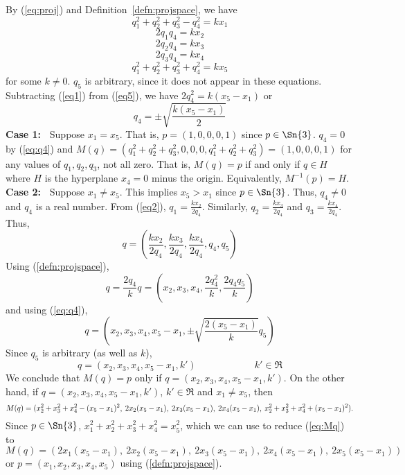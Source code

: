 By (\ref{eq:proj}) and Definition~\ref{defn:projspace}, we have
\begin{equation}
\label{eq1}
	q_1^2 + q_2^2 + q_3^2 - q_4^2 = kx_1
\end{equation}
\begin{equation}
\label{eq2}
	2q_1q_4	= kx_2
\end{equation}
\begin{equation}
\label{eq3}
	2q_2q_4	= kx_3
\end{equation}
\begin{equation}
\label{eq4}
	2q_3q_4	= kx_4
\end{equation}
\begin{equation}
\label{eq5}
	q_1^2 + q_2^2 + q_3^2 + q_4^2 = kx_5
\end{equation}
for some $k \neq 0$.
$q_5$ is arbitrary, since it does not appear in these equations.
Subtracting (\ref{eq1}) from (\ref{eq5}), 
we have $2q_4^2 = k(x_5 - x_1)$
or 
\begin{equation}
\label{eq:q4}
q_4 = \pm \sqrt{\frac{k(x_5-x_1)}{2}}
\end{equation}
%
{\bf Case 1:\ }
Suppose $x_1 = x_5$. That is, $p = (1,0,0,0,1)$ since $p \in \Sn{3}$.
$q_4 = 0$ by (\ref{eq:q4})
and $M(q) = (q_1^2 + q_2^2 + q_3^2, 0, 0, 0, q_1^2 + q_2^2 + q_3^2)
       = (1,0,0,0,1)$ for any values of $q_1,q_2,q_3$, not all zero.
That is, $M(q) = p$ if and only if $q \in H$ where $H$ is 
the hyperplane $x_4 = 0$ minus the origin.
Equivalently, $M^{-1}(p) = H$.\\
%
{\bf Case 2:\ }
Suppose $x_1 \neq x_5$.
This implies $x_5 > x_1$ since $p \in \Sn{3}$. 
Thus, $q_4 \neq 0$ and $q_4$ is a real number.
From (\ref{eq2}), $q_1 = \frac{kx_2}{2q_4}$.
Similarly, $q_2 = \frac{kx_3}{2q_4}$ and $q_3 = \frac{kx_4}{2q_4}$.
Thus, 
\[
	q = (\frac{kx_2}{2q_4}, \frac{kx_3}{2q_4}, \frac{kx_4}{2q_4}, q_4, q_5)
\]
Using (\ref{defn:projspace}), 
\[
	q = \frac{2q_4}{k} q
	  = (x_2, x_3, x_4, \frac{2q_4^2}{k},\frac{2q_4q_5}{k})
\]
and using (\ref{eq:q4}),
\[
	q = (x_2,x_3,x_4,x_5-x_1, \pm \sqrt{\frac{2(x_5-x_1)}{k}} q_5)
\]
Since $q_5$ is arbitrary (as well as $k$),
\[
	q = (x_2,x_3,x_4,x_5-x_1, k') \hspace{1in} k' \in \Re
\]
We conclude that $M(q) = p$ only if 
$q = (x_2,x_3,x_4,x_5 - x_1,k')$.
On the other hand, if $q = (x_2,x_3,x_4,x_5 - x_1,k')$, $k' \in \Re$
and $x_1 \neq x_5$,
then 
\begin{equation}
\label{eq:Mq}
\tiny{
M(q) = (x_2^2 + x_3^2 + x_4^2 - (x_5 - x_1)^2,\ 
	2x_2 (x_5 - x_1),\ 2x_3 (x_5 - x_1),\ 2x_4 (x_5 - x_1),\ 
	x_2^2 + x_3^2 + x_4^2 + (x_5 - x_1)^2).
}	
\end{equation}	
Since $p \in \Sn{3}$, $x_1^2 + x_2^2 + x_3^2 + x_4^2 = x_5^2$,
which we can use to reduce (\ref{eq:Mq}) to
\[
M(q) = (2x_1(x_5 - x_1),\ 2x_2 (x_5 - x_1),\ 2x_3 (x_5 - x_1),\ 2x_4 (x_5 - x_1),\ 
2x_5(x_5 - x_1))
\]
or $p = (x_1,x_2,x_3,x_4,x_5)$ using (\ref{defn:projspace}).

